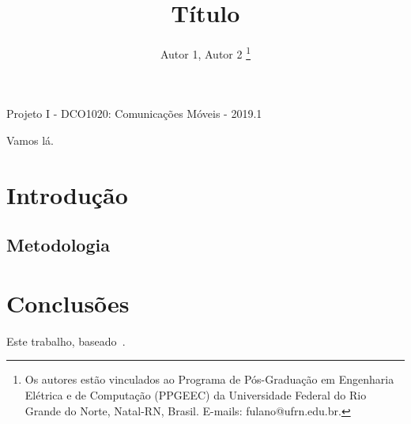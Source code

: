 \documentclass{sbrt2017port}
\begin{document}
\title{Título}

\author{Autor 1, Autor 2
\thanks{Os autores estão vinculados ao Programa de Pós-Graduação em Engenharia Elétrica e de Computação (PPGEEC) da Universidade Federal do Rio Grande do Norte, Natal-RN, Brasil. E-mails: fulano@ufrn.edu.br.}
}

\maketitle

 {Projeto I - DCO1020: Comunicações Móveis - 2019.1}

\begin{resumo}
Vamos lá.
\end{resumo}



\section{Introdução}
\label{sec:intro}

\subsection{Metodologia}
\label{sec:met}

\section{Conclusões}
\label{sec:conc}
Este trabalho, baseado~\cite{imt_above_6GH}.




\end{document}
